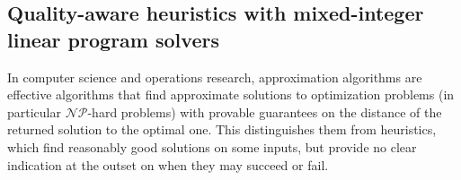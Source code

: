 \documentclass[times,onecolumn,final,authoryear]{article}
\theoremstyle{definition}
\newtheorem{model}{Model}
\begin{document}




\subsection{Quality-aware heuristics with mixed-integer linear program solvers}

In computer science and operations research, approximation algorithms are effective algorithms that find approximate solutions to optimization problems (in particular $\mathcal{NP}$-hard problems) with provable guarantees on the distance of the returned solution to the optimal one. This distinguishes them from heuristics, which find reasonably good solutions on some inputs, but provide no clear indication at the outset on when they may succeed or fail.
\end{document}
